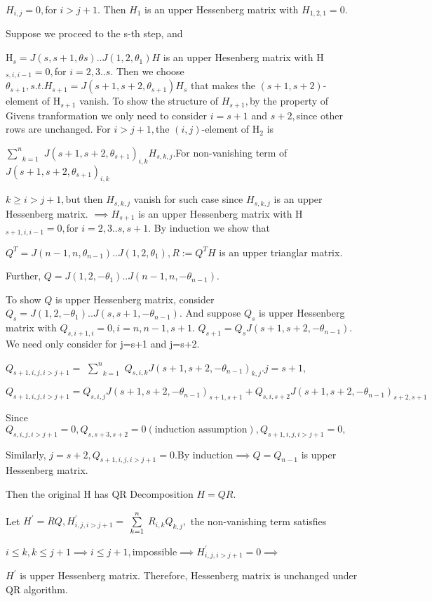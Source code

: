\documentclass{article}
\begin{document}
$H_{i,j}=0,$for $i>j+1.$ Then $H_{1}$ is an upper Hessenberg matrix with $%
H_{1,2,1}=0.$

Suppose we proceed to the s-th step, and 

H$_{s}=J\left( s,s+1,\theta s\right) ..J\left( 1,2,\theta _{1}\right) H$ is
an upper Hesenberg matrix with H$_{s,i,i-1}=0,$for $i=2,3..s$. Then we
choose $\theta _{s+1},s.t.H_{s+1}=J\left( s+1,s+2,\theta _{s+1}\right) H_{s}$
that makes the $\left( s+1,s+2\right) $-element of H$_{s+1}$ vanish. To show
the structure of $H_{s+1},$by the property of Givens tranformation we only
need to consider $i=s+1$ and $s+2,$since other rows are unchanged. For $%
i>j+1,$the $\left( i,j\right) $-element of H$_{2}$ is

$\underset{k=1}{\overset{n}{\sum }}$ $J\left( s+1,s+2,\theta _{s+1}\right)
_{i,k}H_{s,k,j}.$For non-vanishing term of $J\left( s+1,s+2,\theta
_{s+1}\right) _{i,k}$

$k\geq i>j+1,$but then $H_{s,k,j}$ vanish for such case since $H_{s,k,j}$ is
an upper Hessenberg matrix. $\implies H_{s+1}$ is an upper Hessenberg matrix
with H$_{s+1,i,i-1}=0,$for $i=2,3..s,s+1.$ By induction we show that 

$Q^{T}=J\left( n-1,n,\theta _{n-1}\right) ..J\left( 1,2,\theta _{1}\right)
,R:=Q^{T}H$ is an upper trianglar matrix.

Further, $Q=J\left( 1,2,-\theta _{1}\right) ..J\left( n-1,n,-\theta
_{n-1}\right) .$

\bigskip To show $Q$ is upper Hessenberg matrix, consider $Q_{s}=J\left(
1,2,-\theta _{1}\right) ..J\left( s,s+1,-\theta _{n-1}\right) .$ And suppose 
$Q_{s}$ is upper Hessenberg matrix with $Q_{s,i+1,i}=0,i=n,n-1,s+1$. $%
Q_{s+1}=Q_{s}J\left( s+1,s+2,-\theta _{n-1}\right) .$We need only consider
for j=s+1 and j=s+2.

$Q_{s+1,i,j,i>j+1}=$ $\underset{k=1}{\overset{n}{\sum }}$ $Q_{s,i,k}J\left(
s+1,s+2,-\theta _{n-1}\right) _{k,j}.j=s+1,$

$Q_{s+1,i,j,i>j+1}=Q_{s,i,j}J\left( s+1,s+2,-\theta _{n-1}\right)
_{s+1,s+1}+Q_{s,i,s+2}J\left( s+1,s+2,-\theta _{n-1}\right) _{s+2,s+1}$

Since $Q_{s,i,j,i>j+1}=0,Q_{s,s+3,s+2}=0\left( \text{induction assumption}%
\right) ,Q_{s+1,i,j,i>j+1}=0,$

Similarly, $j=s+2,Q_{s+1,i,j,i>j+1}=0.$By induction$\implies Q=Q_{n-1}$ is
upper Hessenberg matrix.

Then the original H has QR Decomposition $H=QR.$

Let $H^{\prime }=RQ,H_{i,j,i>j+1}^{\prime }=$ $\underset{k=1}{\overset{n}{%
\sum }}$ $R_{i,k}Q_{k,j},$ the non-vanishing term satisfies 

$i\leq k,k\leq j+1\implies i\leq j+1,$impossible$\implies
H_{i,j,i>j+1}^{\prime }=0\implies $

$H^{\prime }$ is upper Hessenberg matrix. Therefore, Hessenberg matrix is
unchanged under QR algorithm.
\end{document}
